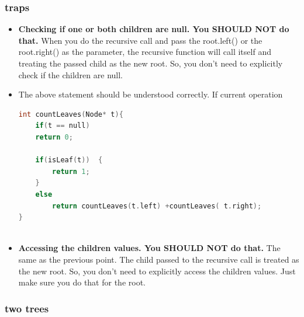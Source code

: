 \documentclass[a4paper,11pt,twoside]{book}
\begin{document}
\subsubsection{traps}
\begin{itemize}
	\item \textbf{Checking if one or both children are null. You SHOULD NOT do that.} When you do the recursive call and pass the root.left() or the root.right() as the parameter, the recursive function will call itself and treating the passed child as the new root. So, you don't need to explicitly check if the children are null.
	
\item The above statement should be understood correctly. If current operation 
\begin{lstlisting}[frame=single, language=c++]
int countLeaves(Node* t){
	if(t == null) 
	return 0;
	
	if(isLeaf(t))  {
		return 1;
	}
	else
		return countLeaves(t.left) +countLeaves( t.right);
}	
	
\end{lstlisting}	
	
	\item \textbf{Accessing the children values. You SHOULD NOT do that.} The same as the previous point. The child passed to the recursive call is treated as the new root. So, you don't need to explicitly access the children values. Just make sure you do that for the root.
	
	
\end{itemize}



\subsubsection{two trees}
\end{document}
